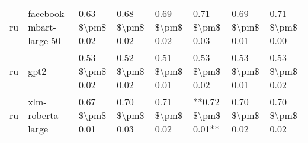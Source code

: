 \begin{tabular}{llllllll}
      ru &            facebook-mbart-large-50 & 0.63 \$\textbackslash pm\$ 0.02 &           0.68 \$\textbackslash pm\$ 0.02 &       0.69 \$\textbackslash pm\$ 0.02 &        0.71 \$\textbackslash pm\$ 0.03 &                         0.69 \$\textbackslash pm\$ 0.01 &     0.71 \$\textbackslash pm\$ 0.00 \\
      ru &                               gpt2 & 0.53 \$\textbackslash pm\$ 0.02 &           0.52 \$\textbackslash pm\$ 0.02 &       0.51 \$\textbackslash pm\$ 0.01 &        0.53 \$\textbackslash pm\$ 0.02 &                         0.53 \$\textbackslash pm\$ 0.01 &     0.53 \$\textbackslash pm\$ 0.02 \\
      ru &                  xlm-roberta-large & 0.67 \$\textbackslash pm\$ 0.01 &           0.70 \$\textbackslash pm\$ 0.03 &       0.71 \$\textbackslash pm\$ 0.02 &    **0.72 \$\textbackslash pm\$ 0.01** &                         0.70 \$\textbackslash pm\$ 0.02 &     0.70 \$\textbackslash pm\$ 0.02 \\
\bottomrule
\end{tabular}

